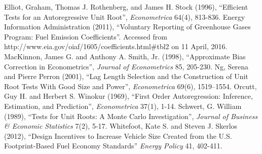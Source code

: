 \documentclass[12pt]{article}
\begin{document}
\begin{thebibliography}{99}

\bibitem{} Elliot, Graham, Thomas J. Rothenberg, and James H. Stock (1996), ``Efficient Tests for an Autoregressive Unit Root'', {\it Econometrica} 64(4), 813-836.
\bibitem{} Energy Information Administration (2011), ``Voluntary Reporting of Greenhouse Gases Program: Fuel Emission Coefficients''. Accessed from http://www.eia.gov/oiaf/1605/coefficients.html\#tbl2 on 11 April, 2016.
\bibitem{} MacKinnon, James G. and Anthony A. Smith, Jr. (1998), ``Approximate Bias Correction in Econometrics'', {\it Journal of Econometrics} 85, 205-230.
\bibitem{} Ng, Serena and Pierre Perron (2001), ``Lag Length Selection and the Construction of Unit Root Tests With Good Size and Power'', {\it Econometrica} 69(6), 1519–1554.
\bibitem{} Orcutt, Guy H. and Herbert S. Winokur (1969), ``First Order Autoregression: Inference, Estimation, and Prediction'', {\it Econometrica} 37(1), 1-14.
\bibitem{} Schwert, G. William (1989), ``Tests for Unit Roots: A Monte Carlo Investigation'', {\it Journal of Business \& Economic Statistics} 7(2), 5-17.
\bibitem{} Whitefoot, Kate S. and Steven J. Skerlos (2012), ``Design Incentives to Increase Vehicle Size Created from the U.S. Footprint-Based Fuel Economy Standards'' {\it Energy Policy} 41, 402-411.

\end{thebibliography}
\end{document}
